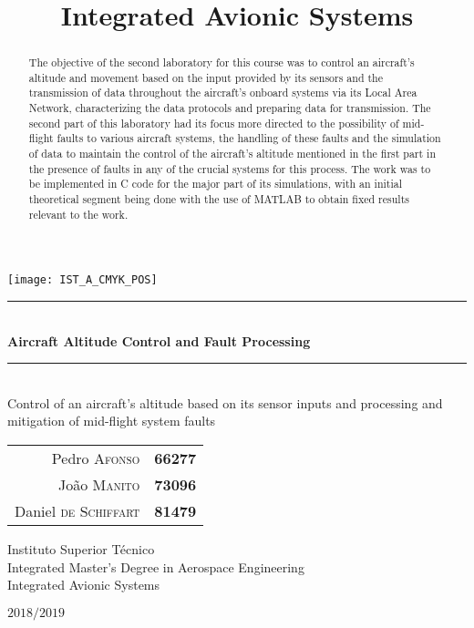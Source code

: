 \documentclass[english,palatino]{ist-report}
\title{Integrated Avionic Systems}
\begin{document}
\begin{titlepage}

\texttt{[image: IST\_A\_CMYK\_POS]}

\begin{center}
	\vspace{40mm} %
	\rule{\linewidth}{0.5pt} \\
	\vspace{2mm}
	{\Huge \textbf{Aircraft Altitude Control and Fault Processing}} \\
	\rule{\linewidth}{2pt} \\
	\vspace{8mm} %
	{\Large Control of an aircraft's altitude based on its sensor inputs and processing and mitigation of mid-flight system faults}
	
	\vspace{\fill} %
	
	\begin{tabular}{r l}
		Pedro \textsc{Afonso} & \textbf{66277} \\
		João \textsc{Manito} & \textbf{73096} \\
		Daniel \textsc{de Schiffart} & \textbf{81479}
	\end{tabular}
	
	\vspace{10mm} %
	{\Large Instituto Superior Técnico} \\
	{\Large Integrated Master's Degree in Aerospace Engineering} \\
	\vspace{1mm}
	{\large Integrated Avionic Systems}
	
	\vspace{10mm} %
	{\Large $2018/2019$}
\end{center}
\end{titlepage}

{\hypersetup{linkcolor = black} \tableofcontents}

\begin{abstract}
	The objective of the second laboratory for this course was to control an aircraft's altitude and movement based on the input provided by its sensors and the transmission of data throughout the aircraft's onboard systems via its Local Area Network, characterizing the data protocols and preparing data for transmission. The second part of this laboratory had its focus more directed to the possibility of mid-flight faults to various aircraft systems, the handling of these faults and the simulation of data to maintain the control of the aircraft's altitude mentioned in the first part in the presence of faults in any of the crucial systems for this process. The work was to be implemented in C code for the major part of its simulations, with an initial theoretical segment being done with the use of \textsc{MATLAB} to obtain fixed results relevant to the work.
\end{abstract}
\end{document}

